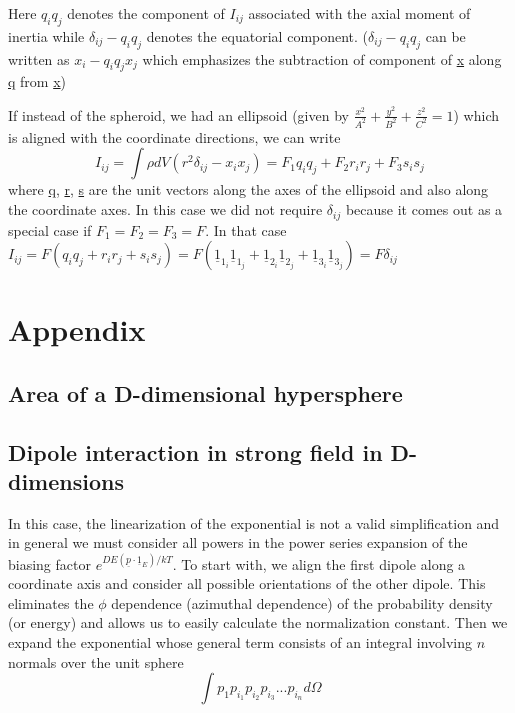 \documentclass[11pt, letterpaper]{article}
\newcommand{\dl}{\delta}
\newcommand{\dij}{\delta_{ij}}
\newcommand{\1}{\bm{1}}
\newcommand{\un}[1]{\underline{#1}}
\begin{document}
Here $q_iq_j$ denotes the component of $I_{ij}$ associated with the axial moment of inertia while $\dij - q_iq_j$ denotes the equatorial component. ($\dij - q_iq_j$ can be written as $x_i - q_iq_jx_j$ which emphasizes the subtraction of component of \un{x} along \un{q} from \un{x})

If instead of the spheroid, we had an ellipsoid (given by $\frac{x^2}{A^2}+\frac{y^2}{B^2}+\frac{z^2}{C^2} = 1$) which is aligned with the coordinate directions, we can write
$$
I_{ij} = \int \rho dV (r^2 \dl_{ij} - x_i x_j) = F_1 q_i q_j + F_2 r_i r_j + F_3 s_is_j
$$
 where \un{q}, \un{r}, \un{s} are the unit vectors along the axes of the ellipsoid and also along the coordinate axes. In this case we did not require $\dij$ because it comes out as a special case if $F_1=F_2=F_3=F$. In that case $I_{ij}=F( q_i q_j + r_i r_j + s_i s_j) = F(\un{1}_{1_i}\un{1}_{1_j} + \un{1}_{2_i}\un{1}_{2_j} + \un{1}_{3_i}\un{1}_{3_j}) = F\dij$
\section{Appendix}

\subsection{Area of a D-dimensional hypersphere}

\subsection{Dipole interaction in strong field in D-dimensions}
In this case, the linearization of the exponential is not a valid simplification and in general we must consider all powers in the power series expansion of the biasing factor $e^{DE(\un{p}\cdot \un{1}_E)/kT}$. To start with, we align the first dipole along a coordinate axis and consider all possible orientations of the other dipole. This eliminates the $\phi$ dependence (azimuthal dependence) of the probability density (or energy) and allows us to easily calculate the normalization constant. Then we expand the exponential whose general term consists of an integral involving $n$ normals over the unit sphere
$$
\int p_1 p_{i_1} p_{i_2} p_{i_3}...p_{i_{n}} d\Omega
$$
\end{document}
